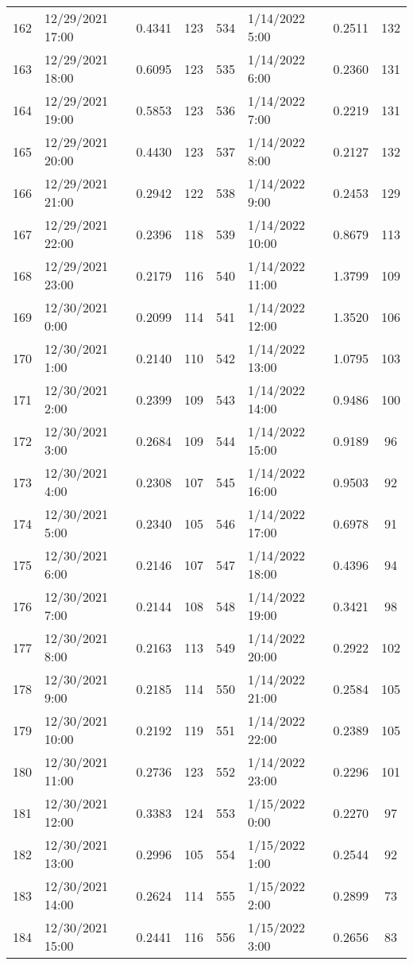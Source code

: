 \begin{center}
\begin{longtable}{llccllcc}
    162&12/29/2021 17:00&0.4341&123&534&1/14/2022 5:00	    &0.2511&132 \\
    163&12/29/2021 18:00&0.6095&123&535&1/14/2022 6:00	    &0.2360&131 \\
    164&12/29/2021 19:00&0.5853&123&536&1/14/2022 7:00	    &0.2219&131 \\
    165&12/29/2021 20:00&0.4430&123&537&1/14/2022 8:00	    &0.2127&132 \\
    166&12/29/2021 21:00&0.2942&122&538&1/14/2022 9:00	    &0.2453&129 \\
    167&12/29/2021 22:00&0.2396&118&539&1/14/2022 10:00	    &0.8679&113 \\
    168&12/29/2021 23:00&0.2179&116&540&1/14/2022 11:00	    &1.3799&109 \\
    169&12/30/2021 0:00	   &0.2099&114&541&1/14/2022 12:00	    &1.3520&106 \\
    170&12/30/2021 1:00	   &0.2140&110&542&1/14/2022 13:00	    &1.0795&103 \\
    171&12/30/2021 2:00	   &0.2399&109&543&1/14/2022 14:00	    &0.9486&100 \\
    172&12/30/2021 3:00	   &0.2684&109&544&1/14/2022 15:00	    &0.9189&96  \\
    173&12/30/2021 4:00	   &0.2308&107&545&1/14/2022 16:00	    &0.9503&92  \\
    174&12/30/2021 5:00	   &0.2340&105&546&1/14/2022 17:00	    &0.6978&91  \\
    175&12/30/2021 6:00	   &0.2146&107&547&1/14/2022 18:00	    &0.4396&94  \\
    176&12/30/2021 7:00	   &0.2144&108&548&1/14/2022 19:00	    &0.3421&98  \\
    177&12/30/2021 8:00	   &0.2163&113&549&1/14/2022 20:00	    &0.2922&102 \\
    178&12/30/2021 9:00	   &0.2185&114&550&1/14/2022 21:00	    &0.2584&105 \\
    179&12/30/2021 10:00&0.2192&119&551&1/14/2022 22:00	    &0.2389&105 \\
    180&12/30/2021 11:00&0.2736&123&552&1/14/2022 23:00	    &0.2296&101 \\
    181&12/30/2021 12:00&0.3383&124&553&1/15/2022 0:00	    &0.2270&97  \\
    182&12/30/2021 13:00&0.2996&105&554&1/15/2022 1:00	    &0.2544&92  \\
    183&12/30/2021 14:00&0.2624&114&555&1/15/2022 2:00	    &0.2899&73  \\
    184&12/30/2021 15:00&0.2441&116&556&1/15/2022 3:00	    &0.2656&83  \\

\end{longtable}
\end{center}
